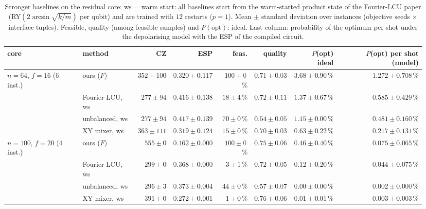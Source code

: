 \begin{table}[t]\centering\scriptsize\setlength{\tabcolsep}{3pt}
\caption{ Stronger baselines on the residual core: ws = warm start: all baselines start from the warm-started product state of the Fourier-LCU paper (RY$(2\arcsin\sqrt{k/m})$ per qubit) and are trained with $12$ restarts ($p=1$). Mean $\pm$ standard deviation over instances (objective seeds $\times$ interface tuples). Feasible, quality (among feasible samples) and $P(\mathrm{opt})$: ideal. Last column: probability of the optimum per shot under the depolarising model with the ESP of the compiled circuit.}\label{tab:core_baselines}
\begin{tabular}{llrrrrrr}\toprule
core & method & CZ & ESP & feas. & quality & $P$(opt) ideal & $P$(opt) per shot (model)\\\midrule
$n=64$, $f=16$ (6 inst.) & ours ($F$) & $352\pm100$ & $0.320\pm0.117$ & $100\pm0$\,\% & $0.71\pm0.03$ & $3.68\pm0.90$\,\% & $1.272\pm0.708$\,\%\\
 & Fourier-LCU, ws & $277\pm94$ & $0.416\pm0.138$ & $18\pm4$\,\% & $0.72\pm0.11$ & $1.37\pm0.67$\,\% & $0.585\pm0.429$\,\%\\
 & unbalanced, ws & $277\pm94$ & $0.417\pm0.139$ & $70\pm0$\,\% & $0.54\pm0.05$ & $1.15\pm0.00$\,\% & $0.481\pm0.160$\,\%\\
 & XY mixer, ws & $363\pm111$ & $0.319\pm0.124$ & $15\pm0$\,\% & $0.70\pm0.03$ & $0.63\pm0.22$\,\% & $0.217\pm0.131$\,\%\\
\midrule
$n=100$, $f=20$ (4 inst.) & ours ($F$) & $555\pm0$ & $0.162\pm0.000$ & $100\pm0$\,\% & $0.75\pm0.06$ & $0.46\pm0.40$\,\% & $0.075\pm0.065$\,\%\\
 & Fourier-LCU, ws & $299\pm0$ & $0.368\pm0.000$ & $3\pm1$\,\% & $0.72\pm0.05$ & $0.12\pm0.20$\,\% & $0.044\pm0.075$\,\%\\
 & unbalanced, ws & $296\pm3$ & $0.373\pm0.004$ & $44\pm0$\,\% & $0.57\pm0.07$ & $0.00\pm0.00$\,\% & $0.002\pm0.000$\,\%\\
 & XY mixer, ws & $391\pm0$ & $0.272\pm0.001$ & $1\pm0$\,\% & $0.76\pm0.06$ & $0.01\pm0.01$\,\% & $0.003\pm0.003$\,\%\\
\bottomrule
\end{tabular}\end{table}
